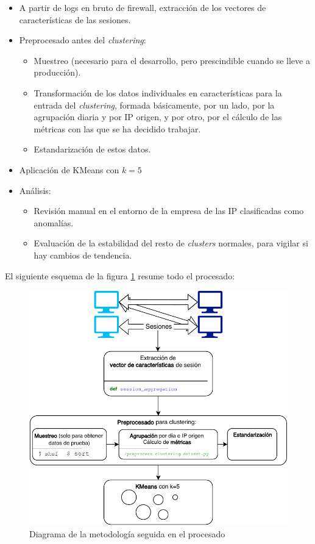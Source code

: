 \begin{itemize}

\item A partir de logs en bruto de firewall, extracción de los vectores de características de las sesiones.

\item Preprocesado antes del \emph{clustering}:

    \begin{itemize}

        \item Muestreo (necesario para el desarrollo, pero prescindible cuando se lleve a producción).

        \item Transformación de los datos individuales en características para la entrada del \emph{clustering},
            formada básicamente, por un lado, por la agrupación diaria y por IP origen, y por otro, por el cálculo de las métricas con las que se ha decidido trabajar.

        \item Estandarización de estos datos.

    \end{itemize}

\item Aplicación de KMeans con $k=5$

\item Análisis:

    \begin{itemize}

        \item Revisión manual en el entorno de la empresa de las IP clasificadas como anomalías.

        \item Evaluación de la estabilidad del resto de \emph{clusters} normales, para vigilar si hay cambios de tendencia.

    \end{itemize}

\end{itemize}

El siguiente esquema de la figura \ref{fig:esquema} resume todo el procesado:

\begin{figure}[h]
    \centering
    \includegraphics{contenido/fig/esquema.pdf}
    \caption{Diagrama de la metodología seguida en el procesado}
    \label{fig:esquema}
\end{figure}
